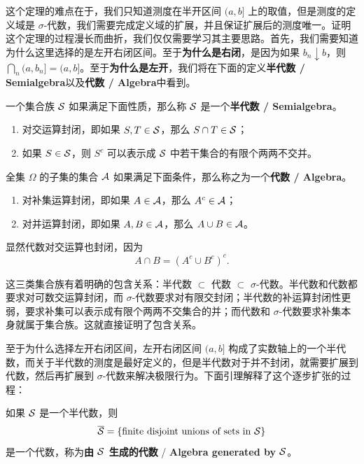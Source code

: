 这个定理的难点在于，我们只知道测度在半开区间 $(a,b]$ 上的取值，但是测度的定义域是 $\sigma$-代数，我们需要完成定义域的扩展，并且保证扩展后的测度唯一。证明这个定理的过程漫长而曲折，我们仅仅需要学习其主要思路。首先，我们需要知道为什么这里选择的是左开右闭区间。至于{\normalfont\bfseries 为什么是右闭}，是因为如果 $b_n \downarrow b$，则 $\bigcap_n (a,b_n] = (a,b]$。至于{\normalfont\bfseries 为什么是左开}，我们将在下面的定义{\normalfont\bfseries 半代数 / Semialgebra}以及{\normalfont\bfseries 代数 / Algebra}中看到。

\begin{definition}
    一个集合族 $\mathcal{S}$ 如果满足下面性质，那么称 $\mathcal{S}$ 是一个{\normalfont\bfseries 半代数 / Semialgebra}。
    \begin{enumerate}
        \item 对交运算封闭，即如果 $S,T \in \mathcal{S}$，那么 $S \cap T \in \mathcal{S}$；
        \item 如果 $S \in \mathcal{S}$，则 $S^c$ 可以表示成 $\mathcal{S}$ 中若干集合的有限个两两不交并。
    \end{enumerate}
\end{definition}

\begin{definition}[代数 / Algebra]
    全集 $\Omega$ 的子集的集合 $\mathcal{A}$ 如果满足下面条件，那么称之为一个{\normalfont\bfseries 代数 / Algebra}。
    \begin{enumerate}
        \item 对补集运算封闭，即如果 $A \in \mathcal{A}$，那么 $A^c \in \mathcal{A}$；
        \item 对并运算封闭，即如果 $A,B \in \mathcal{A}$，那么 $A \cup B \in \mathcal{A}$。
    \end{enumerate}
    显然代数对交运算也封闭，因为
    \[
        A \cap B = (A^c \cup B^c)^c.
    \]
\end{definition}

这三类集合族有着明确的包含关系：半代数 $\subset$ 代数 $\subset$ $\sigma$-代数。半代数和代数都要求对可数交运算封闭，而 $\sigma$-代数要求对有限交封闭；半代数的补运算封闭性更弱，要求补集可以表示成有限个两两不交集合的并；而代数和 $\sigma$-代数要求补集本身就属于集合族。这就直接证明了包含关系。

至于为什么选择左开右闭区间，左开右闭区间 $(a,b]$ 构成了实数轴上的一个半代数，而关于半代数的测度是最好定义的，但是半代数对于并不封闭，就需要扩展到代数，然后再扩展到 $\sigma$-代数来解决极限行为。下面引理解释了这个逐步扩张的过程：

\begin{lemma}\label{lemma-1-1-1}
    如果 $\mathcal{S}$ 是一个半代数，则
    \[
        \overline{\mathcal{S}} = \left\{ \text{finite disjoint unions of sets in } \mathcal{S} \right\}
    \]
    是一个代数，称为{\normalfont\bfseries 由 $\mathcal{S}$ 生成的代数} / {\normalfont\bfseries Algebra generated by $\mathcal{S}$}。
\end{lemma}

